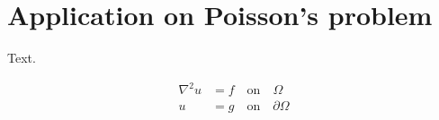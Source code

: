\chapter{Application on Poisson's problem}
\label{ch:results}
Text.

\begin{align}
  \nabla^2 u &= f \quad\text{on}\quad \Omega \\
  u &= g \quad\text{on}\quad \partial\Omega
\end{align}




